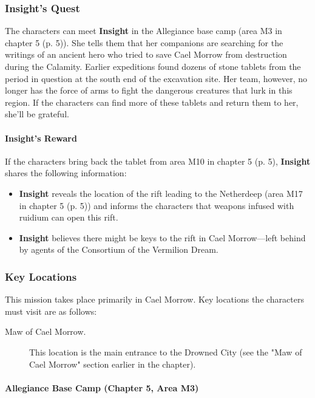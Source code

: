 \documentclass[a4paper, 11pt, bg=full, twocolumn, nooutline]{dndbook}
\begin{document}
\subsubsection{Insight's Quest}

The characters can meet \textbf{Insight} in the Allegiance base camp (area M3 in chapter 5 (p. 5)). She tells them that her companions are searching for the writings of an ancient hero who tried to save Cael Morrow from destruction during the Calamity. Earlier expeditions found dozens of stone tablets from the period in question at the south end of the excavation site. Her team, however, no longer has the force of arms to fight the dangerous creatures that lurk in this region. If the characters can find more of these tablets and return them to her, she'll be grateful.

\paragraph{Insight's Reward}

If the characters bring back the tablet from area M10 in chapter 5 (p. 5), \textbf{Insight} shares the following information:

\begin{itemize}
\item \textbf{Insight} reveals the location of the rift leading to the Netherdeep (area M17 in chapter 5 (p. 5)) and informs the characters that weapons infused with ruidium can open this rift.
\item \textbf{Insight} believes there might be keys to the rift in Cael Morrow---left behind by agents of the Consortium of the Vermilion Dream.
\end{itemize}

\subsubsection{Key Locations}

This mission takes place primarily in Cael Morrow. Key locations the characters must visit are as follows:

\begin{description}
\item[Maw of Cael Morrow.] This location is the main entrance to the Drowned City (see the "Maw of Cael Morrow" section earlier in the chapter).
\end{description}

\paragraph{Allegiance Base Camp (Chapter 5, Area M3)}
\end{document}
